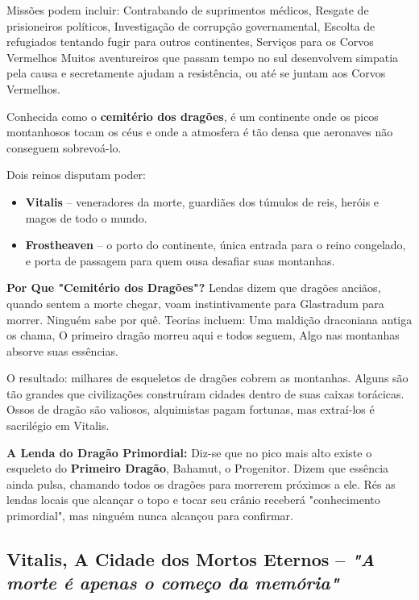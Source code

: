 Missões podem incluir: Contrabando de suprimentos médicos, Resgate de prisioneiros políticos, Investigação de corrupção governamental, Escolta de refugiados tentando fugir para outros continentes, Serviços para os Corvos Vermelhos
Muitos aventureiros que passam tempo no sul desenvolvem simpatia pela causa e secretamente ajudam a resistência, ou até se juntam aos Corvos Vermelhos.

Conhecida como o \textbf{cemitério dos dragões}, é um continente onde os picos montanhosos tocam os céus e onde a atmosfera é tão densa que aeronaves não conseguem sobrevoá-lo.

Dois reinos disputam poder:
\begin{itemize}
    \item \textbf{Vitalis} – veneradores da morte, guardiães dos túmulos de reis, heróis e magos de todo o mundo.
    \item \textbf{Frostheaven} – o porto do continente, única entrada para o reino congelado, e porta de passagem para quem ousa desafiar suas montanhas.
\end{itemize}

\textbf{\ringmfamily Por Que "Cemitério dos Dragões"?}
Lendas dizem que dragões anciãos, quando sentem a morte chegar, voam instintivamente para Glastradum para morrer. Ninguém sabe por quê. Teorias incluem: Uma maldição draconiana antiga os chama, O primeiro dragão morreu aqui e todos seguem, Algo nas montanhas absorve suas essências.

O resultado: milhares de esqueletos de dragões cobrem as montanhas. Alguns são tão grandes que civilizações construíram cidades dentro de suas caixas torácicas. Ossos de dragão são valiosos, alquimistas pagam fortunas, mas extraí-los é sacrilégio em Vitalis.

\textbf{\ringmfamily A Lenda do Dragão Primordial:}
Diz-se que no pico mais alto existe o esqueleto do \textbf{Primeiro Dragão}, Bahamut, o Progenitor. Dizem que essência ainda pulsa, chamando todos os dragões para morrerem próximos a ele. Rés as lendas locais que alcançar o topo e tocar seu crânio receberá "conhecimento primordial", mas ninguém nunca alcançou para confirmar.

\subsection*{Vitalis, A Cidade dos Mortos Eternos – \textit{"A morte é apenas o começo da memória"}}

